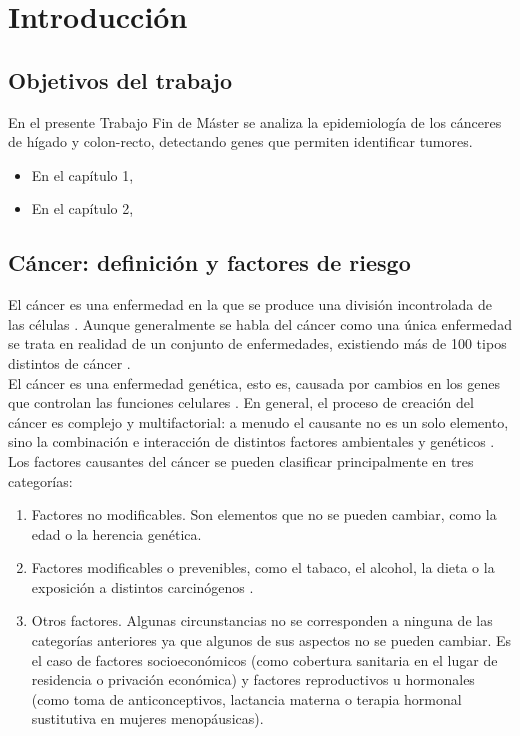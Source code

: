 \chapter{Introducción}

\section{Objetivos del trabajo}

En el presente Trabajo Fin de Máster se analiza la epidemiología de los cánceres de hígado y colon-recto, detectando genes que permiten identificar tumores.

\begin{itemize}
	\item En el capítulo 1, 
	\item En el capítulo 2,
\end{itemize}

\section{Cáncer: definición y factores de riesgo}

El cáncer es una enfermedad en la que se produce una división incontrolada de las células \cite{AmericanCancerSociety2015}. Aunque generalmente se habla del cáncer como una única enfermedad se trata en realidad de un conjunto de enfermedades, existiendo más de 100 tipos distintos de cáncer \cite{NationalCancerInstitute2015}.\\

El cáncer es una enfermedad genética, esto es, causada por cambios en los genes que controlan las funciones celulares \cite{NationalCancerInstitute2015}. En general, el proceso de creación del cáncer es complejo y multifactorial: a menudo el causante no es un solo elemento, sino la combinación e interacción de distintos factores ambientales y genéticos \cite{Migliore2012}.\\

Los factores causantes del cáncer se pueden clasificar principalmente en tres categorías:
\begin{enumerate}
	\item Factores no modificables. Son elementos que no se pueden cambiar, como la edad o la herencia genética.
	\item Factores modificables o prevenibles, como el tabaco, el alcohol, la dieta o la exposición a distintos carcinógenos \cite{Cogliano2011}.
	\item Otros factores. Algunas circunstancias no se corresponden a ninguna de las categorías anteriores ya que algunos de sus aspectos no se pueden cambiar. Es el caso de  factores socioeconómicos (como cobertura sanitaria en el lugar de residencia o privación económica) y factores reproductivos u hormonales (como toma de anticonceptivos, lactancia materna o terapia hormonal sustitutiva en mujeres menopáusicas).
\end{enumerate}

